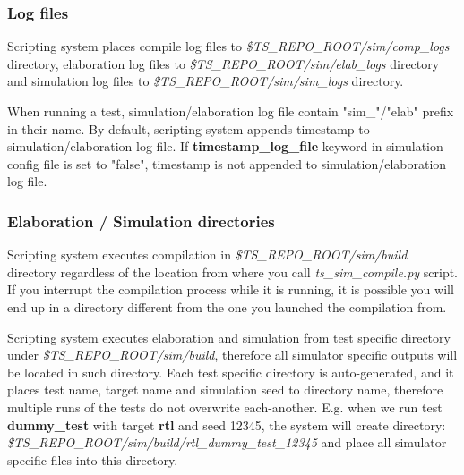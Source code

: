 \documentclass{tropic_design_spec}
\begin{document}
\subsubsection{Log files}
\label{sec:log-files}

Scripting system places compile log files to \textit{\$TS_REPO_ROOT/sim/comp_logs}
directory, elaboration log files to \textit{\$TS_REPO_ROOT/sim/elab_logs} directory
and simulation log files to \textit{\$TS_REPO_ROOT/sim/sim_logs} directory.

When running a test, simulation/elaboration log file contain "sim_"/"elab" prefix in
their name. By default, scripting system appends timestamp to simulation/elaboration
log file. If \textbf{timestamp_log_file} keyword in simulation config file is set to
"false", timestamp is not appended to simulation/elaboration log file.


\subsubsection{Elaboration / Simulation directories}
\label{sec:elaboration-simulation-directories}

Scripting system executes compilation in \textit{\$TS_REPO_ROOT/sim/build} directory 
regardless of the location from where you call \textit{ts_sim_compile.py} script. If you
interrupt the compilation process while it is running, it is possible you will end up in 
a directory different from the one you launched the compilation from.

Scripting system executes elaboration and simulation from test specific directory under
\textit{\$TS_REPO_ROOT/sim/build}, therefore all simulator specific outputs will be
located in such directory. Each test specific directory is auto-generated, and it
places test name, target name and simulation seed to directory name,
therefore multiple runs of the tests do not overwrite each-another. E.g. when we
run test \textbf{dummy_test} with target \textbf{rtl} and seed 12345, the system will
create directory: \textit{\$TS_REPO_ROOT/sim/build/rtl_dummy_test_12345} and place
all simulator specific files into this directory.
\end{document}
